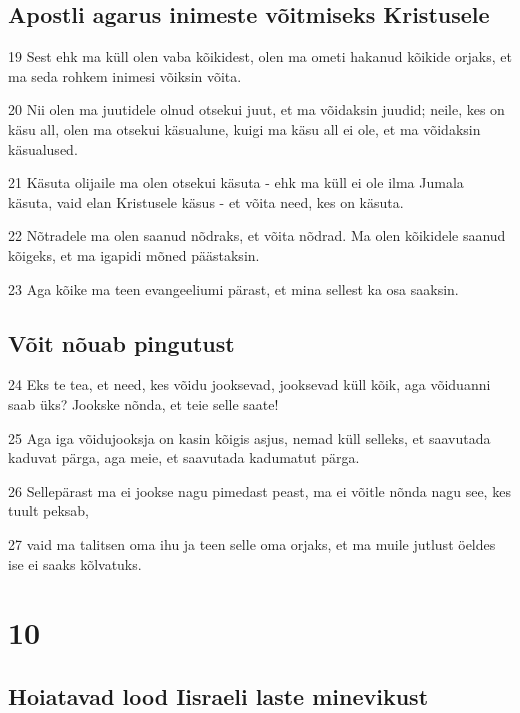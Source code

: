 \section*{Apostli agarus inimeste võitmiseks Kristusele}

\par 19 Sest ehk ma küll olen vaba kõikidest, olen ma ometi hakanud kõikide orjaks, et ma seda rohkem inimesi võiksin võita.
\par 20 Nii olen ma juutidele olnud otsekui juut, et ma võidaksin juudid; neile, kes on käsu all, olen ma otsekui käsualune, kuigi ma käsu all ei ole, et ma võidaksin käsualused.
\par 21 Käsuta olijaile ma olen otsekui käsuta - ehk ma küll ei ole ilma Jumala käsuta, vaid elan Kristusele käsus - et võita need, kes on käsuta.
\par 22 Nõtradele ma olen saanud nõdraks, et võita nõdrad. Ma olen kõikidele saanud kõigeks, et ma igapidi mõned päästaksin.
\par 23 Aga kõike ma teen evangeeliumi pärast, et mina sellest ka osa saaksin.

\section*{Võit nõuab pingutust}

\par 24 Eks te tea, et need, kes võidu jooksevad, jooksevad küll kõik, aga võiduanni saab üks? Jookske nõnda, et teie selle saate!
\par 25 Aga iga võidujooksja on kasin kõigis asjus, nemad küll selleks, et saavutada kaduvat pärga, aga meie, et saavutada kadumatut pärga.
\par 26 Sellepärast ma ei jookse nagu pimedast peast, ma ei võitle nõnda nagu see, kes tuult peksab,
\par 27 vaid ma talitsen oma ihu ja teen selle oma orjaks, et ma muile jutlust öeldes ise ei saaks kõlvatuks.


\chapter{10}

\section*{Hoiatavad lood Iisraeli laste minevikust}


